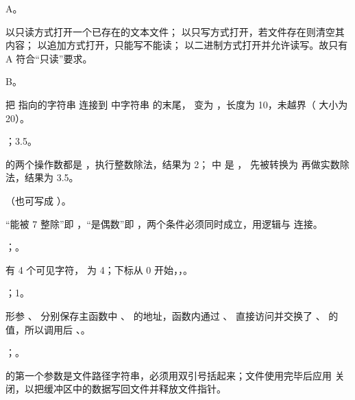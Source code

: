 \documentclass[a4paper,11pt]{article}
\begin{document}
\begin{qgroup}
\q A。
\begin{analysis}
 以只读方式打开一个已存在的文本文件； 以只写方式打开，若文件存在则清空其内容； 以追加方式打开，只能写不能读； 以二进制方式打开并允许读写。故只有 A 符合“只读”要求。
\end{analysis}

\q B。
\begin{analysis}
 把  指向的字符串  连接到  中字符串  的末尾， 变为 ，长度为 10，未越界（ 大小为 20）。
\end{analysis}
\end{qgroup}

\begin{qgroup}
；3.5。
\begin{analysis}
 的两个操作数都是 ，执行整数除法，结果为 2； 中  是 ， 先被转换为  再做实数除法，结果为 3.5。
\end{analysis}

\q {}（也可写成 ）。
\begin{analysis}
“能被 7 整除”即 ，“是偶数”即 ，两个条件必须同时成立，用逻辑与 \code{\&\&} 连接。
\end{analysis}

；。
\begin{analysis}
 有 4 个可见字符， 为 4；下标从 0 开始，，。
\end{analysis}

；1。
\begin{analysis}
形参 、 分别保存主函数中 、 的地址，函数内通过 、 直接访问并交换了 、 的值，所以调用后 、。
\end{analysis}

\q {}；。
\begin{analysis}
 的第一个参数是文件路径字符串，必须用双引号括起来；文件使用完毕后应用  关闭，以把缓冲区中的数据写回文件并释放文件指针。
\end{analysis}
\end{qgroup}
\end{document}

